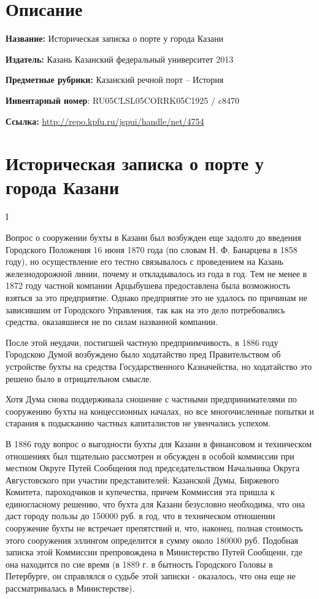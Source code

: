 \documentclass[oneside,final,14pt]{extreport}
\begin{document}
\section*{Описание}

{\bf Название:} Историческая записка о порте у города Казани

{\bf Издатель:} Казань Казанский федеральный университет 2013

{\bf Предметные рубрики:} Казанский речной порт -- История

{\bf Инвентарный номер}: RU05CLSL05CORRK05C1925 / c8470

{\bf Ссылка:} \url{http://repo.kpfu.ru/jspui/handle/net/4754}


\section*{Историческая записка о порте у города Казани}


\begin{center}
	I
\end{center}

Вопрос о сооружении бухты в Казани был возбужден еще задолго до введения Городского Положения 16 июня 1870 года (по словам Н. Ф. Банарцева в 1858 году), но осуществление его тестно связывалось с проведением на Казань железнодорожной линии, почему и откладывалось из года в год. Тем не менее в 1872 году частной компании Арцыбушева предоставлена была возможность взяться за это предприятие. Однако предприятие это не удалось по причинам не зависившим от Городского Управления, так как на это дело потребовались средства, оказавшиеся не по силам названной компании.

После этой неудачи, постигшей частную предприимчивость, в 1886 году Городскою Думой возбуждено было ходатайство пред Правительством об устройстве бухты на средства Государственного Казначейства, но ходатайство это решено было в отрицательном смысле.

Хотя Дума снова поддерживала сношение с частными предпринимателями по сооружению бухты на концессионных началах, но все многочисленные попытки и старания к подысканию частных капиталистов не увенчались успехом.

В 1886 году вопрос о выгодности бухты для Казани в финансовом и техническом отношениях был тщательно рассмотрен и обсужден в особой коммиссии при местном Округе Путей Сообщения под председательством Начальника Округа Августовского при участии представителей: Казанской Думы, Биржевого Комитета, пароходчиков и купечества, причем Коммиссия эта пришла к единогласному решению, что бухта для Казани безусловно необходима, что она даст городу пользы до 150000 руб. в год, что в техническом отношении сооружение бухты не встречает препятствий и, что, наконец,  полная стоимость этого сооружения эллингом определится в сумму около 180000 руб. Подобная записка этой Коммиссии препровождена в Министерство Путей Сообщени, где она находится по сие время (в 1889 г. в бытность Городского Головы в Петербурге, он справлялся о судьбе этой записки - оказалось, что она еще не рассматривалась в Министерстве). 
\end{document}
